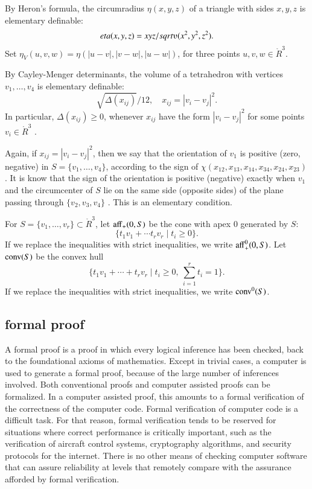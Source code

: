By Heron's formula, the circumradius $\eta(x,y,z)$ of a triangle with sides $x,y,z$ is elementary definable:
$$\eta(x,y,z) = x y z/\sqrt{\ups(x^2,y^2,z^2)}.$$
Set $\eta_V(u,v,w) = \eta(|u-v|,|v-w|,|u-w|)$, for three points
$u,v,w\in\ring{R}^3$.

By Cayley-Menger determinants, the volume  of a tetrahedron with vertices $v_1,\ldots,v_4$ is elementary definable:
   $$
   \sqrt{\Delta(x_{ij})}/12,\quad x_{ij}=|v_i-v_j|^2.
   $$
In particular, $\Delta(x_{ij})\ge0$, whenever $x_{ij}$ have
the form $|v_i-v_j|^2$ for some points $v_i\in\ring{R}^3$
\cite[Lemma~8.1.4]{SPI}.

Again, if $x_{ij}=|v_i-v_j|^2$, then we say that the orientation
of $v_1$ is positive (zero, negative) in $S=\{v_1,\ldots,v_4\}$,
according to the sign of $\chi(x_{12},x_{13},x_{14},x_{34},x_{24},x_{23})$.
It is know that the sign of the orientation is positive (negative) exactly
when $v_1$ and the circumcenter of $S$ lie on the same side (opposite sides) of the
plane passing through $\{v_2,v_3,v_4\}$ \cite[Lemma~5.15]{DCG}.  This is an elementary condition. 

For $S=\{v_1,\ldots,v_r\}\subset\ring{R}^3$, let ${\operatorname{aff}}_+(0,S)$
be the cone with apex $0$ generated by $S$:
  $$
  \{ t_1 v_1 + \cdots t_r v_r \mid  t_i \ge 0\}.
  $$
If we replace the inequalities with strict inequalities, we
write ${\operatorname{aff}}_+^0(0,S)$.
Let ${\operatorname{conv}}(S)$ be the convex hull
  $$
  \{ t_1 v_1 + \cdots + t_r v_r \mid t_i \ge 0,\ \sum_{i=1}^r t_i=1\}.
  $$
If we replace the inequalities with strict inequalities, we write
${\operatorname{conv}}^0(S)$.





\subsection{formal proof}

A formal proof is a proof in which every logical inference has
been checked, back to the foundational axioms of mathematics. 
Except in trivial cases, a computer is used to generate a formal
proof, because of the large number of inferences involved.
Both conventional proofs and computer assisted proofs can be
formalized.  In a computer assisted proof, this amounts to a
formal verification of the correctness of the computer code.
Formal verification of computer code is a difficult task.
For that reason,  formal verification tends to be reserved
for situations where correct performance 
is critically important, such as the verification of aircraft
control systems, cryptography algorithms, 
and security protocols for the internet.
There is no other means of checking 
computer software that can assure reliability at levels that
remotely compare with the
assurance afforded by formal verification. 



